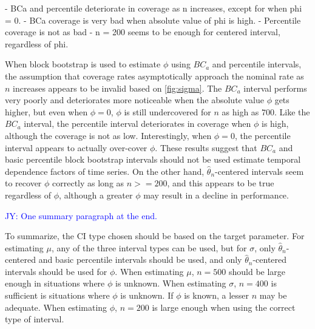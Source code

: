 \documentclass[12pt, letterpaper, titlepage]{article}
\newcommand{\jy}[1]{\textcolor{blue}{JY: #1}}
\begin{document}
- BCa and percentile deteriorate in coverage as n increases, except for when
phi = 0.
- BCa coverage is very bad when absolute value of phi is high.
- Percentile coverage is not as bad
- n = 200 seems to be enough for centered interval, regardless of phi.


When block bootstrap is used to estimate $\phi$ using $BC_a$ and percentile
intervals, the assumption that coverage rates asymptotically approach the
nominal rate as $n$ increases appears to be invalid based on \ref{fig:sigma}.
The $BC_a$ interval performs very poorly and deteriorates more noticeable
when the absolute value $\phi$ gets
higher, but even when $\phi = 0$, $\phi$ is still undercovered for $n$ as high
as $700$. Like the $BC_a$ interval, the percentile interval deteriorates in
coverage when $\phi$ is high, although the coverage is not as low.
Interestingly, when $\phi = 0$, the percentile interval appears to actually
over-cover $\phi$. These results suggest that $BC_a$ and basic percentile
block bootstrap intervals should not be used estimate temporal dependence
factors of time series. On the other hand, $\hat{\theta}_{n}$-centered
intervals seem to recover $\phi$ correctly as long as $n >= 200$, and this
appears to be true regardless of $\phi$, although a greater $\phi$ may result
in a decline in performance.

\jy{One summary paragraph at the end.}

To summarize, the CI type chosen should be based on the target parameter.
For estimating $\mu$, any of the three interval types can be used, but for
$\sigma$, only $\hat{\theta}_{n}$-centered and basic percentile intervals
should be used, and only $\hat{\theta}_{n}$-centered intervals should be used
for $\phi$. When estimating
$\mu$, $n = 500$ should be large enough in situations where $\phi$ is unknown.
When estimating $\sigma$, $n = 400$ is sufficient is situations where $\phi$ is
unknown. If $\phi$ is known, a lesser $n$ may be adequate. When estimating
$\phi$, $n = 200$ is large enough when using the correct type of interval.
\end{document}
